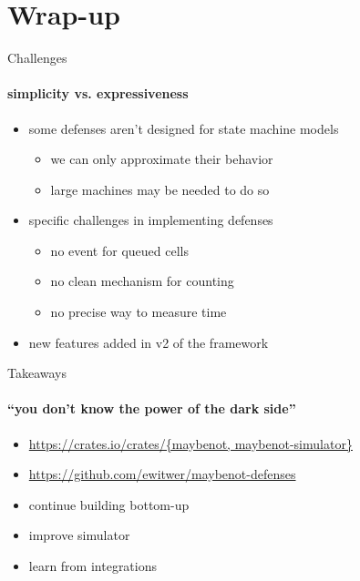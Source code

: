 \documentclass[xcolor=x11names,dvipsnames,aspectratio=169]{beamer}
\begin{document}
\section{Wrap-up}
\begin{frame}{Challenges}
  \framesubtitle{simplicity vs. expressiveness}
  \begin{itemize}
    \item some defenses aren't designed for state machine models
    \begin{itemize}
        \item we can only approximate their behavior
        \item large machines may be needed to do so
    \end{itemize}
    \item specific challenges in implementing defenses
    \begin{itemize}
        \item no event for queued cells
        \item no clean mechanism for counting
        \item no precise way to measure time
    \end{itemize}
    \item new features added in v2 of the framework
  \end{itemize}
\end{frame}

\begin{frame}{Takeaways}
  \framesubtitle{``you don't know the power of the dark side''}
  \begin{itemize}
    \item \url{https://crates.io/crates/{maybenot, maybenot-simulator}}
    \item \url{https://github.com/ewitwer/maybenot-defenses}
    \bigskip
    \item continue building bottom-up
    \item improve simulator
    \item learn from integrations
  \end{itemize}
\end{frame}

  \backmatter
\end{document}
